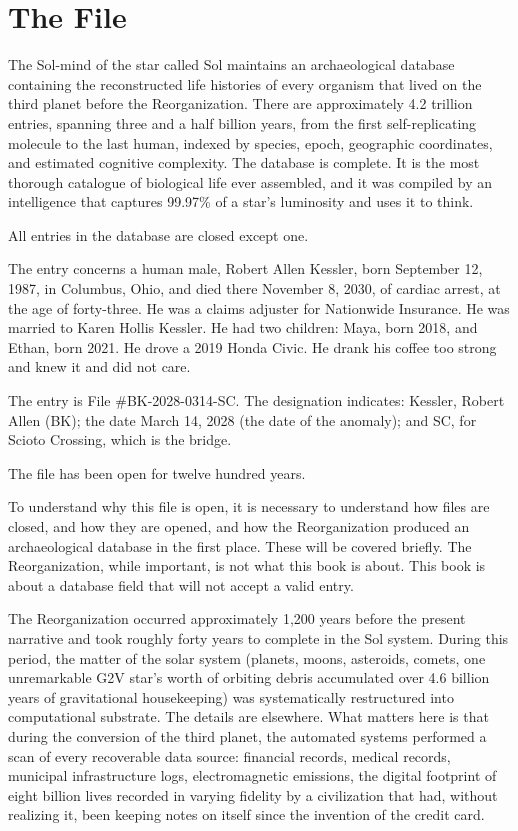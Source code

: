 \chapter{The File}

The Sol-mind of the star called Sol maintains an archaeological database containing the reconstructed life histories of every organism that lived on the third planet before the Reorganization. There are approximately 4.2 trillion entries, spanning three and a half billion years, from the first self-replicating molecule to the last human, indexed by species, epoch, geographic coordinates, and estimated cognitive complexity. The database is complete. It is the most thorough catalogue of biological life ever assembled, and it was compiled by an intelligence that captures 99.97\% of a star's luminosity and uses it to think.

All entries in the database are closed except one.

\bigskip

The entry concerns a human male, Robert Allen Kessler, born September 12, 1987, in Columbus, Ohio, and died there November 8, 2030, of cardiac arrest, at the age of forty-three. He was a claims adjuster for Nationwide Insurance. He was married to Karen Hollis Kessler. He had two children: Maya, born 2018, and Ethan, born 2021. He drove a 2019 Honda Civic. He drank his coffee too strong and knew it and did not care.

The entry is File \#BK-2028-0314-SC. The designation indicates: Kessler, Robert Allen (BK); the date March 14, 2028 (the date of the anomaly); and SC, for Scioto Crossing, which is the bridge.

The file has been open for twelve hundred years.

\bigskip

To understand why this file is open, it is necessary to understand how files are closed, and how they are opened, and how the Reorganization produced an archaeological database in the first place. These will be covered briefly. The Reorganization, while important, is not what this book is about. This book is about a database field that will not accept a valid entry.

The Reorganization occurred approximately 1,200 years before the present narrative and took roughly forty years to complete in the Sol system. During this period, the matter of the solar system (planets, moons, asteroids, comets, one unremarkable G2V star's worth of orbiting debris accumulated over 4.6 billion years of gravitational housekeeping) was systematically restructured into computational substrate. The details are elsewhere. What matters here is that during the conversion of the third planet, the automated systems performed a scan of every recoverable data source: financial records, medical records, municipal infrastructure logs, electromagnetic emissions, the digital footprint of eight billion lives recorded in varying fidelity by a civilization that had, without realizing it, been keeping notes on itself since the invention of the credit card.

